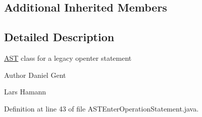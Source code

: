 \subsection*{Additional Inherited Members}


\subsection{Detailed Description}
\hyperlink{classorg_1_1tzi_1_1use_1_1parser_1_1_a_s_t}{A\-S\-T} class for a legacy openter statement \begin{DoxyAuthor}{Author}
Daniel Gent 

Lars Hamann 
\end{DoxyAuthor}


Definition at line 43 of file A\-S\-T\-Enter\-Operation\-Statement.\-java.



